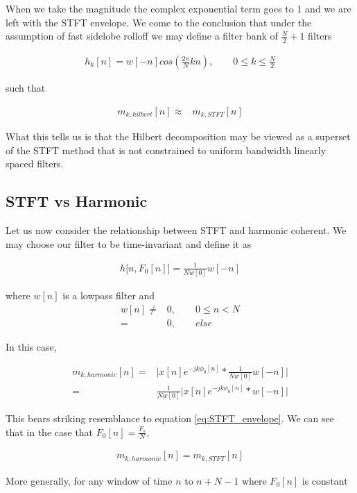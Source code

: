 \documentclass [11pt, proquest] {uwthesis}[2015/03/03]
\begin{document}
When we take the magnitude the complex exponential term goes to 1 and we are left with the STFT envelope.  We come to the conclusion that under the assumption of fast sidelobe rolloff we may define a filter bank of $\frac{N}{2} + 1$ filters

\begin{align}
h_k[n] = w[-n]cos(\frac{2\pi}{N}kn), \qquad 0 \leq k \leq \frac{N}{2}
\end{align}

such that

\begin{align}
m_{k,hilbert}[n] \approx& m_{k,STFT}[n]
\end{align}

What this tells us is that the Hilbert decomposition may be viewed as a superset of the STFT method that is not constrained to uniform bandwidth linearly spaced filters.

\subsection{STFT vs Harmonic}

Let us now consider the relationship between STFT and harmonic coherent.  We may choose our filter to be time-invariant and define it as

\begin{align}
h\big[n, F_0[n] \big] = \frac{1}{Nw[0]} w[-n]
\end{align}

where $w[n]$ is a lowpass filter and 
\begin{align}
w[n] \neq& 0, \qquad 0 \leq n < N \nonumber \\
=& 0, \qquad else
\end{align}

In this case,

\begin{align}
m_{k,harmonic}[n] =& \Big| x[n] e^{-jk\phi_0 [n]} *  \frac{1}{Nw[0]} w[-n] \Big|  \nonumber \\
=& \frac{1}{Nw[0]} \Big| x[n] e^{-jk\phi_0 [n]} *  w[-n] \Big|
\end{align}

This bears striking resemblance to equation \ref{eq:STFT_envelope}.  We can see that in the case that $F_0[n] = \frac{F_s}{N}$,

\begin{align}
m_{k,harmonic}[n] = m_{k,STFT}[n]
\end{align}

More generally, for any window of time $n$ to $n + N - 1$ where $F_0[n]$ is constant
\end{document}

